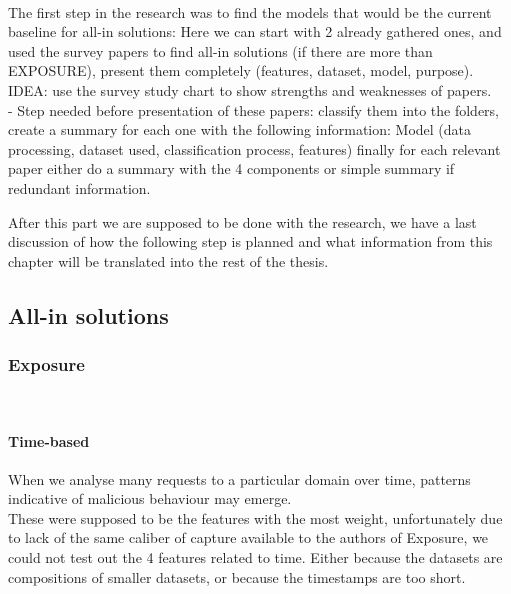 \\
The first step in the research was to find the models that would be the current baseline for all-in solutions: Here we can start with 2 already gathered ones, and used the survey papers to find all-in solutions (if there are more than EXPOSURE), present them completely (features, dataset, model, purpose). 
IDEA: use the survey study chart to show strengths and weaknesses of papers.
\\
- Step needed before presentation of these papers:
classify them into the folders, 
create a summary for each one with the following information:
Model (data processing, dataset used, classification process, features)
finally for each relevant paper either do a summary with the 4 components or simple summary if redundant information.


After this part we are supposed to be done with the research, we have a last discussion of how the following step is planned and what information from this chapter will be translated into the rest of the thesis.



\subsection{All-in solutions}
\subsubsection{Exposure}

\cite{exposure}

\\

\paragraph{Time-based}
When we analyse many requests to a particular domain over
time, patterns indicative of malicious behaviour may emerge.\\
These were supposed to be the features with the most weight, unfortunately due to lack of the same caliber of capture available to the authors of Exposure, we could not test out the 4 features related to time. Either because the datasets are compositions of smaller datasets, or because the timestamps are too short.
